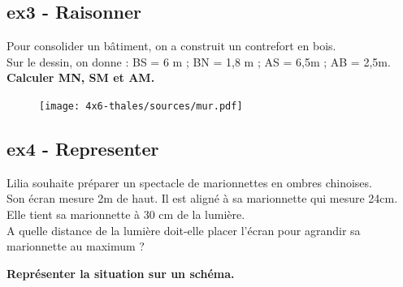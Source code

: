 \documentclass[12pt]{article}
\begin{document}
\begin{multicols}{3}
  \subsection*{ex3 - Raisonner}
  Pour consolider un bâtiment, on a construit un contrefort en bois. \\
  Sur le dessin, on donne : BS = 6 m ; BN = 1,8 m ; AS = 6,5m ; AB = 2,5m.\\
  \textbf{Calculer MN, SM et AM.}
  \begin{figure}[H]
    \centering
    \texttt{[image: 4x6-thales/sources/mur.pdf]}
  \end{figure}


  \subsection*{ex4 - Representer}
  Lilia souhaite préparer un spectacle de marionnettes en ombres chinoises. \\
  Son écran mesure 2m de haut. Il est aligné à sa marionnette qui mesure 24cm.
  Elle tient sa marionnette à 30 cm de la lumière.\\
  A quelle distance de la lumière doit-elle placer l’écran pour agrandir sa marionnette au maximum ?

  \textbf{Représenter la situation sur un schéma.}
\end{multicols}
\end{document}
